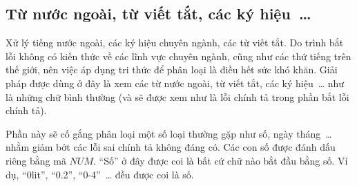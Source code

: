 \documentclass[a4paper,oneside,14pt]{extbook} %
\newcommand{\note}[1]{\underline{#1}}
\begin{document}




\subsection{Từ nước ngoài, từ viết tắt, các ký hiệu~\ldots{}}

Xử lý tiếng nước ngoài, các ký hiệu chuyên ngành, các từ viết tắt. Do
trình bắt lỗi không có kiến thức về các lĩnh vực chuyên 
ngành, cũng như các thứ tiếng trên thế giới, nên việc áp dụng tri thức
để phân loại là điều hết sức khó khăn.  Giải pháp được dùng ở đây là
xem các từ nước ngoài, từ viết tắt, các ký hiệu~\ldots{} như là 
những chữ bình thường (và sẽ được xem như là lỗi chính tả trong phần
bắt lỗi chính tả).

Phần này sẽ cố gắng phân loại một số loại thường gặp như số, ngày
tháng~\ldots{} nhằm giảm bớt các lỗi sai chính tả không đáng có. Các
con số được đánh dấu riêng bằng mã $NUM$. ``Số'' ở đây được coi là bất
cứ chữ nào bắt đầu bằng số. Ví dụ, ``0lit'', ``0.2'',
``0-4''~\ldots{}{} đều được coi là số. 
\end{document}
